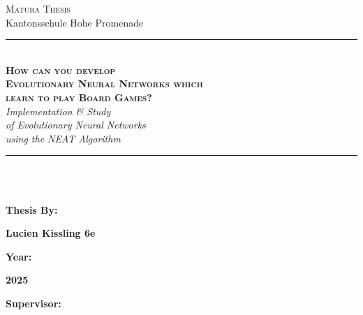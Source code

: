 \documentclass[11pt, a4paper, notitlepage]{report}
\begin{document}
    \begin{titelpage}
        \BgThispage
            \color{white} {
                \begin{center}
                    \Large \textsc{Matura Thesis}\\Kantonsschule Hohe Promenade\\
                    \rule[0.1cm]{15.8cm}{0.1mm}\\
                    \vspace{3cm}
                    \Huge \textbf{ \textsc{How can you develop \\Evolutionary Neural Networks which \\learn to play Board Games?}}\\
                    \vspace{0.8cm}
                    \Large \textit {Implementation \& Study \\of Evolutionary Neural Networks \\using the NEAT Algorithm}\\
                \end{center}
                \vspace{3cm}
                \rule[0.1cm]{15.8cm}{0.1mm}\\
                \vspace{7cm}\\
                \begin{minipage}[t]{0.47\textwidth}
                \large\textbf {Thesis By:}\\
                \end{minipage}
                \hfill
                \begin{minipage}[t]{0.47\textwidth}\raggedleft
                \large\textbf {Lucien Kissling 6e}\\
                \end{minipage}
                \begin{minipage}[t]{0.47\textwidth}
                \large \textbf {Year:}\\
                \end{minipage}
                \hfill
                \begin{minipage}[t]{0.47\textwidth}\raggedleft
                \large \textbf {2025}\\
                \end{minipage}
                \begin{minipage}[t]{0.47\textwidth}
                \large \textbf {Supervisor:}\\

\end{minipage}}
\end{titelpage}
\end{document}
